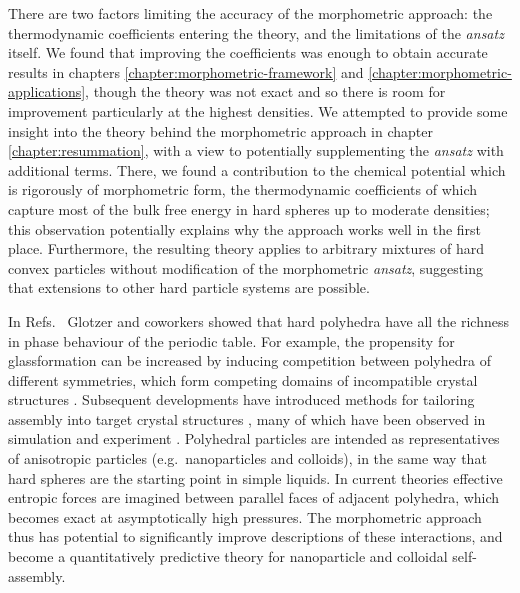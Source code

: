 \documentclass[11pt,twoside]{report}
\begin{document}
There are two factors limiting the accuracy of the morphometric approach: the thermodynamic coefficients entering the theory, and the limitations of the \emph{ansatz} itself.
We found that improving the coefficients was enough to obtain accurate results in chapters \ref{chapter:morphometric-framework} and \ref{chapter:morphometric-applications}, though the theory was not exact and so there is room for improvement particularly at the highest densities.
We attempted to provide some insight into the theory behind the morphometric approach in chapter \ref{chapter:resummation}, with a view to potentially supplementing the \emph{ansatz} with additional terms.
There, we found a contribution to the chemical potential which is rigorously of morphometric form, the thermodynamic coefficients of which capture most of the bulk free energy in hard spheres up to moderate densities; this observation potentially explains why the approach works well in the first place.
Furthermore, the resulting theory applies to arbitrary mixtures of hard convex particles without modification of the morphometric \emph{ansatz}, suggesting that extensions to other hard particle systems are possible.


In Refs.\ \cite{DamascenoS2012,DamascenoAN2012} Glotzer and coworkers showed that hard polyhedra have all the richness in phase behaviour of the periodic table.
For example, the propensity for glassformation can be increased by inducing competition between polyhedra of different symmetries, which form competing domains of incompatible crystal structures \cite{TeichNC2019}.
Subsequent developments have introduced methods for tailoring assembly into target crystal structures \cite{YoungACIE2013,SchultzAN2015,VanAndersAN2015}, many of which have been observed in simulation and experiment \cite{MisztaNM2011,HenzieNM2012,QiJCP2013}.
Polyhedral particles are intended as representatives of anisotropic particles (e.g.\ nanoparticles and colloids), in the same way that hard spheres are the starting point in simple liquids.
In current theories \cite{YoungACIE2013} effective entropic forces are imagined between parallel faces of adjacent polyhedra, which becomes exact at asymptotically high pressures.
The morphometric approach thus has potential to significantly improve descriptions of these interactions, and become a quantitatively predictive theory for nanoparticle and colloidal self-assembly.
\end{document}
